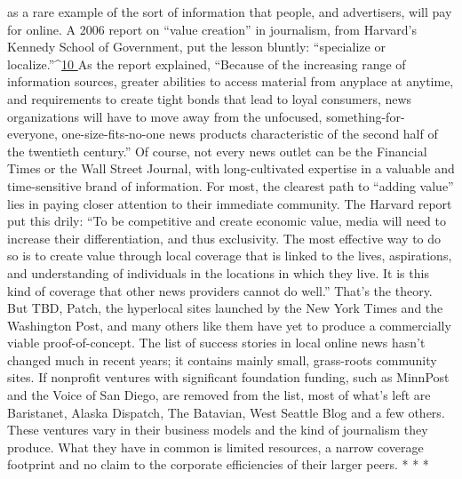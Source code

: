 as a rare example of the sort of information that people, and advertisers, will pay
for online.
A 2006 report on ``value creation'' in journalism, from Harvard’s Kennedy
School of Government, put the lesson bluntly: ``specialize or localize.''^{\href{#endnotes-ch3}{10 }}As the
report explained, ``Because of the increasing range of information sources, greater
abilities to access material from anyplace at anytime, and requirements to create
tight bonds that lead to loyal consumers, news organizations will have to move
away from the unfocused, something-for-everyone, one-size-fits-no-one news
products characteristic of the second half of the twentieth century.''
Of course, not every news outlet can be the Financial Times or the Wall Street
Journal, with long-cultivated expertise in a valuable and time-sensitive brand of
information. For most, the clearest path to ``adding value'' lies in paying closer attention
to their immediate community. The Harvard report put this drily: ``To be
competitive and create economic value, media will need to increase their differentiation,
and thus exclusivity. The most effective way to do so is to create value
through local coverage that is linked to the lives, aspirations, and understanding
of individuals in the locations in which they live. It is this kind of coverage that
other news providers cannot do well.''
That’s the theory. But TBD, Patch, the hyperlocal sites launched by the New
York Times and the Washington Post, and many others like them have yet to
produce a commercially viable proof-of-concept. The list of success stories in
local online news hasn’t changed much in recent years; it contains mainly small,
grass-roots community sites. If nonprofit ventures with significant foundation
funding, such as MinnPost and the Voice of San Diego, are removed from the
list, most of what’s left are Baristanet, Alaska Dispatch, The Batavian, West Seattle
Blog and a few others.
These ventures vary in their business models and the kind of journalism they
produce. What they have in common is limited resources, a narrow coverage
footprint and no claim to the corporate efficiencies of their larger peers.
* * *

